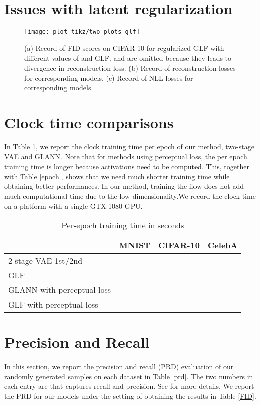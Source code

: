 \documentclass{article}
\begin{document}
\section{Issues with latent regularization}\label{additional}

\begin{figure}[ht]
\centering
\texttt{[image: plot\_tikz/two\_plots\_glf]}
\caption{(a) Record of FID scores on CIFAR-10 for regularized GLF with different values of  and  GLF.  and  are omitted because they leads to divergence in reconstruction loss. (b) Record of reconstruction losses for corresponding models. (c) Record of NLL losses for corresponding models.}  \label{fig:cifar glf}
\end{figure}

\section{Clock time comparisons}\label{time}
In Table \ref{clock}, we report the clock training time per epoch of our method, two-stage VAE and GLANN. Note that for methods using perceptual loss, the per epoch training time is longer because activations need to be computed. This, together with Table \ref{epoch}, shows that we need much shorter training time while obtaining better performances. In our method, training the flow does not add much computational time due to the low dimensionality.We record the clock time on a platform with a single GTX 1080 GPU. 

\begin{table}[ht]
  \caption{Per-epoch training time in seconds}
  \label{clock}
  \centering
  \begin{tabular}{llll}
    \toprule
        & MNIST & CIFAR-10 & CelebA \\
    \midrule
	 
     2-stage VAE 1st/2nd  &  &  & \\
     GLF &  &  &    \\
     GLANN with perceptual loss&  &  & \\
     GLF with perceptual loss &  &  &  \\
    \bottomrule
  \end{tabular}
\end{table}



\section{Precision and Recall}\label{appD}
In this section, we report the precision and recall (PRD) evaluation of our randomly generated samples on each dataset in Table \ref{prd}. The two numbers in each entry are  that captures recall and precision. See \citep{PRD} for more details. We report the PRD for our models under the setting of obtaining the results in Table \ref{FID}. 
\end{document}
